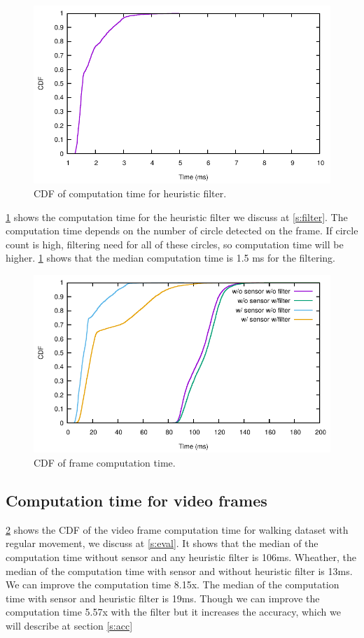 \begin{figure}[h!]
\centering
\includegraphics[width=5.2in]{plots/sunny_cdf_filter.pdf}
\caption{CDF of computation time for heuristic filter.}
\label{f:cdf_fil}
\end{figure}

\ref{f:cdf_fil} shows the computation time for the heuristic filter we discuss at \ref{s:filter}.
The computation time depends on the number of circle detected on the frame.
If circle count is high, filtering need for all of these circles, so computation time will be higher.
\ref{f:cdf_fil} shows that the median computation time is 1.5 ms for the filtering. 


\begin{figure}[h!]
\centering
\includegraphics[width=5.2in]{plots/walk_cdf_time.pdf}
\caption{CDF of frame computation time.}
\label{f:cdf_time}
\end{figure}

\subsection{Computation time for video frames}
\ref{f:cdf_time} shows the CDF of the video frame computation time for walking dataset with regular movement, we discuss at \ref{s:eval}.
It shows that the median of the computation time without sensor and any heuristic filter is 106ms.
Wheather, the median of the computation time with sensor and without heuristic filter is 13ms.
We can improve the computation time 8.15x.
The median of the computation time with sensor and heuristic filter is 19ms.
Though we can improve the computation time 5.57x with the filter but it increases the accuracy, which we will describe at section \ref{s:acc}

